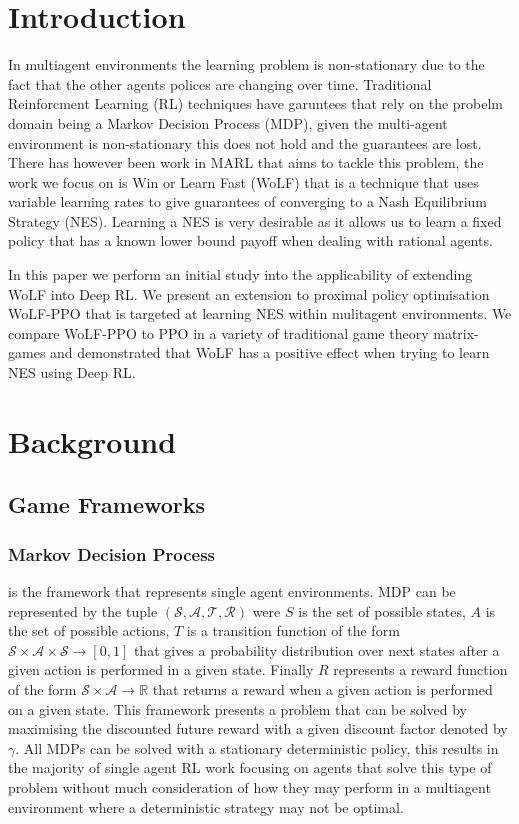 \documentclass[conference]{IEEEtran}
\begin{document}
\section{Introduction}

In multiagent environments the learning problem is non-stationary due to the fact that the other agents polices are changing over time. Traditional Reinforcment Learning (RL) techniques have garuntees that rely on the probelm domain being a Markov Decision Process (MDP), given the multi-agent environment is non-stationary this does not hold and the guarantees are lost. There has however been work in MARL that aims to tackle this problem, the work we focus on is Win or Learn Fast (WoLF) that is a technique that uses variable learning rates to give guarantees of converging to a Nash Equilibrium Strategy (NES). Learning a NES is very desirable as it allows us to learn a fixed policy that has a known lower bound payoff when dealing with rational agents.

In this paper we perform an initial study into the applicability of extending WoLF into Deep RL. We present an extension to proximal policy optimisation WoLF-PPO that is targeted at learning NES within mulitagent environments. We compare WoLF-PPO to PPO in a variety of traditional game theory matrix-games and demonstrated that WoLF has a positive effect when trying to learn NES using Deep RL.

\section{Background}

\subsection{Game Frameworks}

\subsubsection{Markov Decision Process} is the framework that represents single agent environments. MDP can be represented by the tuple $(\mathcal{S}, \mathcal{A}, \mathcal{T}, \mathcal{R})$ were $S$ is the set of possible states, $A$ is the set of possible actions, $T$ is a transition function of the form $\mathcal{S}\times\mathcal{A}\times\mathcal{S}\rightarrow [0,1]$ that gives a probability distribution over next states after a given action is performed in a given state. Finally $R$ represents a reward function of the form $\mathcal{S}\times\mathcal{A}\rightarrow \mathbb{R}$ that returns a reward when a given action is performed on a given state. This framework presents a problem that can be solved by maximising the discounted future reward with a given discount factor denoted by $\gamma$. All MDPs can be solved with a stationary deterministic policy, this results in the majority of single agent RL work focusing on agents that solve this type of problem without much consideration of how they may perform in a multiagent environment where a deterministic strategy may not be optimal.
\end{document}
